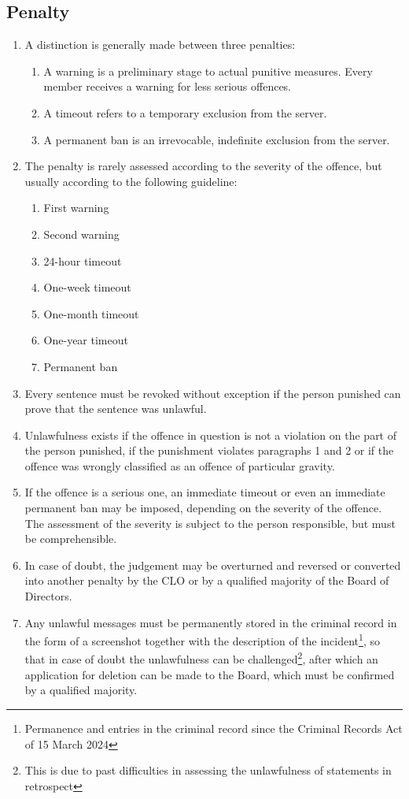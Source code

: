 \documentclass{article}
\begin{document}
\subsection{Penalty}
\begin{enumerate}[(1)]
	\item A distinction is generally made between three penalties:
	\begin{enumerate}[1.]
		\item A warning is a preliminary stage to actual punitive measures. Every member receives a warning for less serious offences.
		\item A timeout refers to a temporary exclusion from the server.
		\item A permanent ban is an irrevocable, indefinite exclusion from the server.
	\end{enumerate}
	\item The penalty is rarely assessed according to the severity of the offence, but usually according to the following guideline:
	\begin{enumerate}[1.]
		\item First warning
		\item Second warning
		\item 24-hour timeout
		\item One-week timeout
		\item One-month timeout
		\item One-year timeout
		\item Permanent ban
	\end{enumerate}
	\item Every sentence must be revoked without exception if the person punished can prove that the sentence was unlawful.
	\item Unlawfulness exists if the offence in question is not a violation on the part of the person punished, if the punishment violates paragraphs 1 and 2 or if the offence was wrongly classified as an offence of particular gravity.
	\item If the offence is a serious one, an immediate timeout or even an immediate permanent ban may be imposed, depending on the severity of the offence. The assessment of the severity is subject to the person responsible, but must be comprehensible. 
	\item In case of doubt, the judgement may be overturned and reversed or converted into another penalty by the CLO or by a qualified majority of the Board of Directors.
	\item Any unlawful messages must be permanently stored in the criminal record in the form of a screenshot together with the description of the incident\footnote{Permanence and entries in the criminal record since the Criminal Records Act of 15 March 2024}, so that in case of doubt the unlawfulness can be challenged\footnote{This is due to past difficulties in assessing the unlawfulness of statements in retrospect}, after which an application for deletion can be made to the Board, which must be confirmed by a qualified majority.

\end{enumerate}
\end{document}
